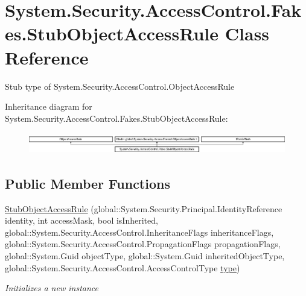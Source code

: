 \hypertarget{class_system_1_1_security_1_1_access_control_1_1_fakes_1_1_stub_object_access_rule}{\section{System.\-Security.\-Access\-Control.\-Fakes.\-Stub\-Object\-Access\-Rule Class Reference}
\label{class_system_1_1_security_1_1_access_control_1_1_fakes_1_1_stub_object_access_rule}
}


Stub type of System.\-Security.\-Access\-Control.\-Object\-Access\-Rule 


Inheritance diagram for System.\-Security.\-Access\-Control.\-Fakes.\-Stub\-Object\-Access\-Rule\-:\begin{figure}[H]
\begin{center}
\leavevmode
\includegraphics[height=0.942761cm]{class_system_1_1_security_1_1_access_control_1_1_fakes_1_1_stub_object_access_rule}
\end{center}
\end{figure}
\subsection*{Public Member Functions}
\begin{DoxyCompactItemize}
\item 
\hyperlink{class_system_1_1_security_1_1_access_control_1_1_fakes_1_1_stub_object_access_rule_a3b3cb748a753d8679628ce947b707c34}{Stub\-Object\-Access\-Rule} (global\-::\-System.\-Security.\-Principal.\-Identity\-Reference identity, int access\-Mask, bool is\-Inherited, global\-::\-System.\-Security.\-Access\-Control.\-Inheritance\-Flags inheritance\-Flags, global\-::\-System.\-Security.\-Access\-Control.\-Propagation\-Flags propagation\-Flags, global\-::\-System.\-Guid object\-Type, global\-::\-System.\-Guid inherited\-Object\-Type, global\-::\-System.\-Security.\-Access\-Control.\-Access\-Control\-Type \hyperlink{jquery-1_810_82-vsdoc_8js_a3940565e83a9bfd10d95ffd27536da91}{type})
\begin{DoxyCompactList}\small\item\em Initializes a new instance\end{DoxyCompactList}\end{DoxyCompactItemize}
